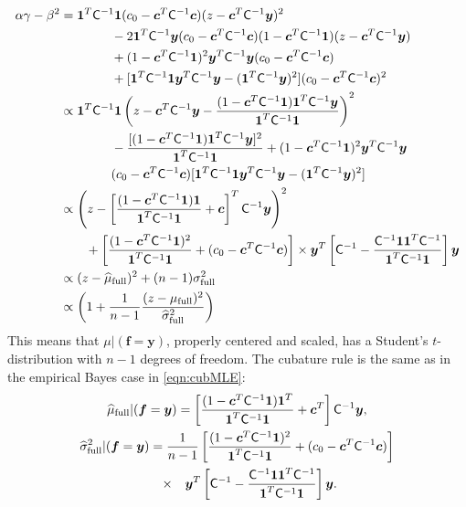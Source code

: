 \documentclass[smallextended]{svjour3}       %
\newcommand{\bm}[1]{\boldsymbol{#1}}
\newcommand{\vc}{\bm{c}}
\newcommand{\vf}{\bm{f}}
\newcommand{\vy}{\bm{y}}
\newcommand{\vone}{\bm{1}}
\newcommand{\mC}{\mathsf{C}}
\begin{document}
\begin{align*}
\alpha \gamma - \beta^2 
& = \vone^T \mC^{-1} \vone (c_0  -\vc ^T \mC^{-1} \vc) (z - \vc^T \mC^{-1} \vy )^2 \\
& \qquad \qquad - 2 \vone^T \mC^{-1} \vy (c_0  -\vc ^T \mC^{-1} \vc)(1 - \vc^T \mC^{-1} \vone)(z - \vc^T \mC^{-1} \vy ) \\
& \qquad \qquad + (1 - \vc^T \mC^{-1} \vone)^2 \vy^T \mC^{-1} \vy (c_0  -\vc ^T \mC^{-1} \vc) \\
&\qquad \qquad  + [\vone^T \mC^{-1} \vone \vy^T \mC^{-1} \vy - (\vone^T \mC^{-1} \vy)^2](c_0  -\vc ^T \mC^{-1} \vc)^2  \\
& \propto \vone^T \mC^{-1} \vone  \left (z - \vc^T \mC^{-1} \vy - \frac{(1 - \vc^T \mC^{-1} \vone)\vone^T \mC^{-1} \vy}{\vone^T \mC^{-1} \vone } \right )^2 \\
& \qquad \qquad -  \frac{[(1 - \vc^T \mC^{-1} \vone)\vone^T \mC^{-1} \vy]^2}{\vone^T \mC^{-1} \vone }  
+ (1 - \vc^T \mC^{-1} \vone)^2 \vy^T \mC^{-1} \vy \\
& \qquad \qquad (c_0  -\vc ^T \mC^{-1} \vc) [\vone^T \mC^{-1} \vone  \vy^T \mC^{-1} \vy
- (\vone^T \mC^{-1} \vy)^2] \\
& \propto \left (z - \left[ \frac{(1 - \vc^T \mC^{-1} \vone)\vone}{\vone^T \mC^{-1} \vone } + \vc \right]^T \mC^{-1} \vy \right )^2 \\
& \qquad  + \left[\frac{(1 - \vc^T \mC^{-1} \vone)^2}{\vone^T \mC^{-1} \vone} + (c_0  -\vc ^T \mC^{-1} \vc) \right] \times \vy^T\left[ \mC^{-1} 
- \frac{ \mC^{-1} \vone\vone^T \mC^{-1}}{\vone^T \mC^{-1} \vone}  \right]\vy
\\
& \propto (z - \widehat{\mu}_{\textup{full}})^2 + (n-1) \sigma_{\textup{full}}^2
\\
& \propto \left(1 +  \frac{1}{n-1} \frac{(z - \mu_{\textup{full}})^2}{\widehat{\sigma}_{\textup{full}}^2} \right)
\end{align*}
This means that $\mu \vert (\vf = \vy )$, properly centered and scaled, has a Student's $t$-distribution with $n-1$ degrees of freedom. The cubature rule is the same as in the empirical Bayes case in \eqref{eqn:cubMLE}:
\begin{gather}\label{FJH:eq:cubFull}
\widehat{\mu}_{\textup{full}}  \vert ( \vf = \vy) = \left[\frac{(1 -  \vc^T \mC^{-1}\vone)\vone^T}{\vone^T \mC^{-1} \vone} + \vc^T \right] \mC^{-1}  \vy,
\\
\label{FJH:eq:signmaFull}
\widehat{\sigma}^2_{\textup{full}}  \vert ( \vf = \vy)  
= \frac{1}{n-1}
\left[\frac{(1 - \vc^T \mC^{-1} \vone)^2}{\vone^T \mC^{-1} \vone} + (c_0  -\vc ^T \mC^{-1} \vc) \right] 
\\
\nonumber
\qquad \times \quad \vy^T\left[ \mC^{-1} 
- \frac{ \mC^{-1} \vone\vone^T \mC^{-1}}{\vone^T \mC^{-1} \vone}  \right]\vy .
\end{gather}
\end{document}
